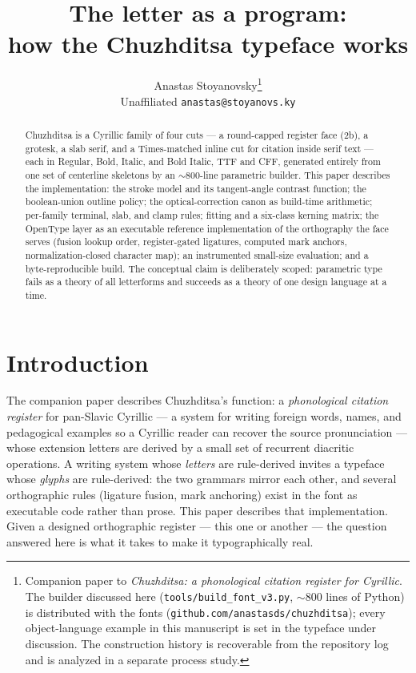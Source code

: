 \documentclass[11pt]{article}
\title{\textbf{The letter as a program:\\ how the Chuzhditsa typeface works}}
\author{Anastas Stoyanovsky\thanks{Companion paper to \emph{Chuzhditsa: a phonological citation register for Cyrillic}. The builder discussed here (\texttt{tools/build\_font\_v3.py}, $\sim$800 lines of Python) is distributed with the fonts (\texttt{github.com/anastasds/chuzhditsa}); every object-language example in this manuscript is set in the typeface under discussion. The construction history is recoverable from the repository log and is analyzed in a separate process study.}\\[3pt] {\normalsize Unaffiliated \quad \texttt{anastas@stoyanovs.ky}}}
\date{}
\begin{document}
\maketitle

\begin{abstract}
\noindent Chuzhditsa is a Cyrillic family of four cuts — a round-capped register face (2b), a grotesk, a slab serif, and a Times-matched inline cut for citation inside serif text — each in Regular, Bold, Italic, and Bold Italic, TTF and CFF, generated entirely from one set of centerline skeletons by an $\sim$800-line parametric builder. This paper describes the implementation: the stroke model and its tangent-angle contrast function; the boolean-union outline policy; the optical-correction canon as build-time arithmetic; per-family terminal, slab, and clamp rules; fitting and a six-class kerning matrix; the OpenType layer as an executable reference implementation of the orthography the face serves (fusion lookup order, register-gated ligatures, computed mark anchors, normalization-closed character map); an instrumented small-size evaluation; and a byte-reproducible build. The conceptual claim is deliberately scoped: parametric type fails as a theory of all letterforms and succeeds as a theory of one design language at a time.
\end{abstract}

\section{Introduction}

The companion paper describes Chuzhditsa's function: a \emph{phonological citation register} for pan-Slavic Cyrillic — a system for writing foreign words, names, and pedagogical examples so a Cyrillic reader can recover the source pronunciation — whose extension letters are derived by a small set of recurrent diacritic operations. A writing system whose \emph{letters} are rule-derived invites a typeface whose \emph{glyphs} are rule-derived: the two grammars mirror each other, and several orthographic rules (ligature fusion, mark anchoring) exist in the font as executable code rather than prose. This paper describes that implementation. Given a designed orthographic register — this one or another — the question answered here is what it takes to make it typographically real.
\end{document}
